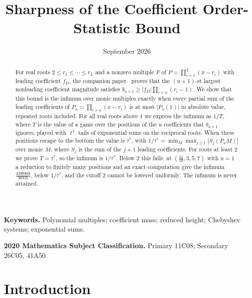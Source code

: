 \documentclass[11pt]{article}
\title{Sharpness of the Coefficient Order-Statistic Bound}
\author{\shortstack{Bangyen Pham\\
\small Independent Researcher\\
\small\href{mailto:bangyenp@gmail.com}{\texttt{bangyenp@gmail.com}}\\
\small\href{https://orcid.org/0009-0006-9928-2088}{ORCID: 0009-0006-9928-2088}}}
\date{September 2026}
\theoremstyle{definition}
\theoremstyle{plain}
\begin{document}
\maketitle

\begin{abstract}
For real roots $2\le r_1\le\cdots\le r_L$ and a nonzero multiple $F$ of
$P=\prod_{i=1}^L(x-r_i)$ with leading coefficient $f_D$, the companion
paper~\cite{coefficient-mass} proves that the $(u+1)$-st largest nonleading
coefficient magnitude satisfies $b_{u+1}\ge|f_D|\prod_{i>u}(r_i-1)$.  We show
that this bound is the infimum over monic multiples exactly when every
partial sum of the leading coefficients of $P_u=\prod_{i>u}(x-r_i)$ is at
most $|P_u(1)|$ in absolute value, repeated roots included.  For all real
roots above $1$ we express the infimum as $1/T$, where $T$ is the value of a
game over the positions of the $u$ coefficients that $b_{u+1}$ ignores,
played with $\ell^1$ tails of exponential sums on the reciprocal roots.
When these positions escape to the bottom the value is $\tau^*$, with
$1/\tau^*=\min_M\max_{j\ge1}|S_j(P_uM)|$ over monic $M$, where $S_j$ is the
sum of the $j+1$ leading coefficients.  For roots at least $2$ we prove
$T=\tau^*$, so the infimum is $1/\tau^*$.  Below $2$ this fails: at
$(\tfrac{11}{10},3,5,7)$ with $u=1$ a reduction to finitely many positions
and an exact computation give the infimum $\tfrac{3398808}{96935}$, below
$1/\tau^*$, and the cutoff $2$ cannot be lowered uniformly.  The infimum
is never attained.
\end{abstract}

\noindent\textbf{Keywords.} Polynomial multiples; coefficient mass; reduced
height; Chebyshev systems; exponential sums.

\noindent\textbf{2020 Mathematics Subject Classification.} Primary 11C08; Secondary 26C05, 41A50.

\section{Introduction}
\end{document}
